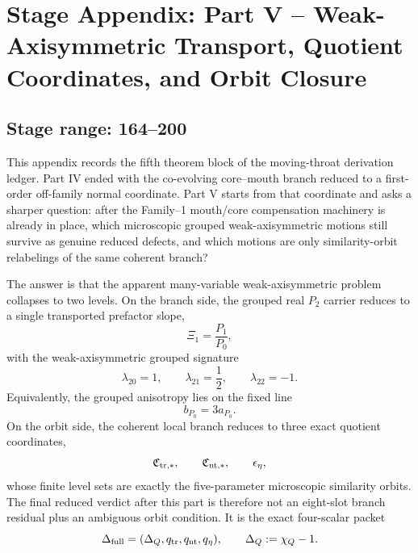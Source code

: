 \chapter{Stage Appendix: Part V -- Weak-Axisymmetric Transport, Quotient Coordinates, and Orbit Closure}
\label{app:stage-part-5}

\section*{Stage range: 164--200}

This appendix records the fifth theorem block of the moving-throat derivation ledger.  Part IV ended with the co-evolving core--mouth branch reduced to a first-order off-family normal coordinate.  Part V starts from that coordinate and asks a sharper question: after the Family--1 mouth/core compensation machinery is already in place, which microscopic grouped weak-axisymmetric motions still survive as genuine reduced defects, and which motions are only similarity-orbit relabelings of the same coherent branch?

The answer is that the apparent many-variable weak-axisymmetric problem collapses to two levels.  On the branch side, the grouped real \(P_2\) carrier reduces to a single transported prefactor slope,
\begin{equation}
\label{eq:app-part05-intro-xi1}
\Xi_1=\frac{P_1}{P_0},
\end{equation}
with the weak-axisymmetric grouped signature
\begin{equation}
\label{eq:app-part05-intro-lambda-signature}
\lambda_{20}=1,
\qquad
\lambda_{21}=\frac12,
\qquad
\lambda_{22}=-1.
\end{equation}
Equivalently, the grouped anisotropy lies on the fixed line
\begin{equation}
\label{eq:app-part05-intro-b3a}
b_{P_0}=3a_{P_0}.
\end{equation}
On the orbit side, the coherent local branch reduces to three exact quotient coordinates,
\begin{equation}
\label{eq:app-part05-intro-quotient-coordinates}
\mathfrak C_{{\rm tr},*},
\qquad
\mathfrak C_{{\rm nt},*},
\qquad
\epsilon_\eta,
\end{equation}
whose finite level sets are exactly the five-parameter microscopic similarity orbits.  The final reduced verdict after this part is therefore not an eight-slot branch residual plus an ambiguous orbit condition.  It is the exact four-scalar packet
\begin{equation}
\label{eq:app-part05-intro-final-packet}
\Delta_{\rm full}
=
(\Delta_Q,q_{\rm tr},q_{\rm nt},q_\eta),
\qquad
\Delta_Q:=\chi_Q-1.
\end{equation}

